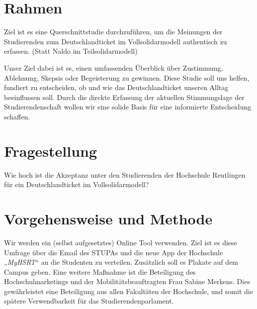 
\newcommand{\germanQuote}[1]{„\textit{#1}“}


\label{chap:introduction}


\chapter{Rahmen}
\label{sect:frame}
Ziel ist es eine Querschnittstudie durchzuführen, um die Meinungen der Studierenden zum Deutschlandticket im Vollsolidarmodell authentisch zu erfassen. (Statt Naldo im Teilsolidarmodell)

Unser Ziel dabei ist es, einen umfassenden Überblick über Zustimmung, Ablehnung, Skepsis oder Begeisterung zu gewinnen. Diese Studie soll uns helfen, fundiert zu entscheiden, ob und wie das Deutschlandticket unseren Alltag beeinflussen soll. Durch die direkte Erfassung der aktuellen Stimmungslage der Studierendenschaft wollen wir eine solide Basis für eine informierte Entscheidung schaffen.

\chapter{Fragestellung}
\label{sect:question}
Wie hoch ist die Akzeptanz unter den Studierenden der Hochschule Reutlingen für ein Deutschlandticket im Vollsolidarmodell?

\chapter{Vorgehensweise und Methode}
\label{sect:methods}
Wir werden ein (selbst aufgesetztes) Online Tool verwenden. Ziel ist es diese Umfrage über die Email des STUPAs und die neue App der Hochschule \germanQuote{MyHSRT} an die Studenten zu verteilen. Zusätzlich soll es Plakate auf dem Campus geben. Eine weitere  Maßnahme ist die Beteiligung des Hochschulmarketings und der Mobilitätsbeauftragten Frau  Sabine Merkens. 
Dies gewährleistet eine Beteiligung aus allen Fakultäten der Hochschule, und somit die spätere Verwendbarkeit für das Studierendenparlament.

